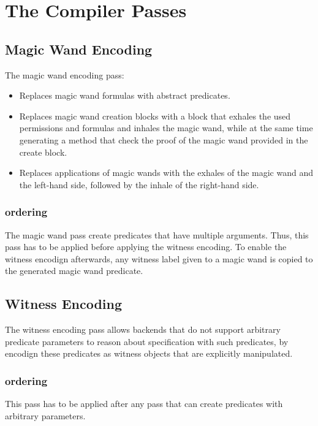 \chapter{The Compiler Passes}

\section{Magic Wand Encoding}

The magic wand encoding pass:
\begin{itemize}
\item Replaces magic wand formulas with abstract predicates.
\item Replaces magic wand creation blocks with a block that exhales the 
used permissions and formulas and inhales the magic wand,
while at the same time generating a method that check the proof
of the magic wand provided in the create block.
\item Replaces applications of magic wands with the exhales of the 
magic wand and the left-hand side, followed by the inhale of the right-hand side.
\end{itemize}

\subsection{ordering}

The magic wand pass create predicates that have multiple arguments.
Thus, this pass has to be applied before applying the witness encoding.
To enable the witness encodign afterwards, any witness label given to a
magic wand is copied to the generated magic wand predicate.


\section{Witness Encoding}

The witness encoding pass allows backends that do not support arbitrary
predicate parameters to reason about specification with such predicates,
by encodign these predicates as witness objects that are explicitly
manipulated.

\subsection{ordering}

This pass has to be applied after any pass that can create predicates
with arbitrary parameters.


